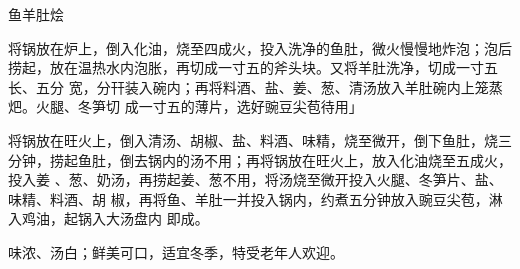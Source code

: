 \begin{recipe}{鱼羊肚烩}

\ingredients


\preparation

\step 将锅放在炉上，倒入化油，烧至四成火，投入洗净的鱼肚，微火慢慢地炸泡；泡后
捞起，放在温热水内泡胀，再切成一寸五的斧头块。又将羊肚洗净，切成一寸五长、五分
宽，分幵装入碗内；再将料酒、盐、姜、葱、清汤放入羊肚碗内上笼蒸𤆵。火腿、冬笋切
成一寸五的薄片，选好豌豆尖苞待用」

\step 将锅放在旺火上，倒入清汤、胡椒、盐、料酒、味精，烧至微开，倒下鱼肚，烧三
分钟，捞起鱼肚，倒去锅内的汤不用；再将锅放在旺火上，放入化油烧至五成火，投入姜
、葱、奶汤，再捞起姜、葱不用，将汤烧至微开投入火腿、冬笋片、盐、味精、料酒、胡
椒，再将鱼、羊肚一并投入锅内，约煮五分钟放入豌豆尖苞，淋入鸡油，起锅入大汤盘内
即成。

\features

味浓、汤白；鲜美可口，适宜冬季，特受老年人欢迎。

\end{recipe}

